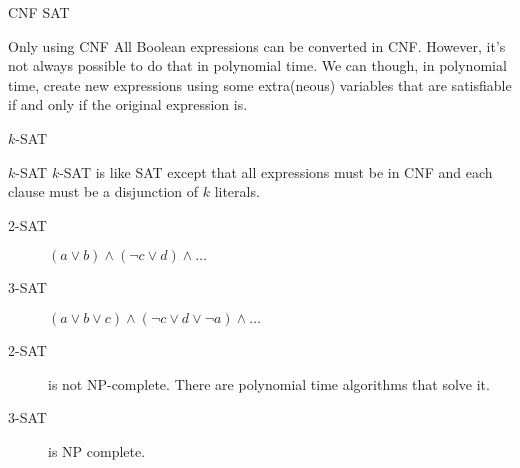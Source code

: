 \begin{frame}{CNF SAT}
  
  {
    \begin{block}{Only using CNF}
    All Boolean expressions can be converted in CNF.
    However, it's not always possible to do that in polynomial time.
    We can though, in polynomial time, create new expressions using some extra(neous) variables that are satisfiable if and only if the original expression is.
  \end{block}}
  \vspace{0.5cm} 
\end{frame}


\begin{frame}{$k$-SAT}
  
  {
    \begin{block}{$k$-SAT}
     $k$-SAT is like SAT except that all expressions must be in CNF and each clause must be a disjunction of $k$ literals.
  \end{block}}
  \vspace{0.25cm}
  \begin{description}
  \item[2-SAT] $(a \vee b) \wedge (\neg c \vee d) \wedge \ldots$
  \vspace{0.25cm}
  \item[3-SAT] $(a \vee b \vee c) \wedge (\neg c \vee d \vee \neg a) \wedge \ldots$
  \end{description}
    \vspace{0.25cm}
   \begin{description}
     \item[2-SAT] is not NP-complete. There are polynomial time algorithms that solve it.
     \vspace{0.25cm}
     \item[3-SAT] is NP complete.
   \end{description}
\end{frame}


